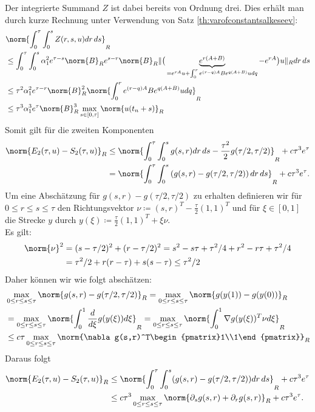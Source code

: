 Der integrierte Summand $Z$ ist dabei bereits von Ordnung drei. Dies erhält man durch kurze Rechnung unter Verwendung von Satz \ref{th:varofconstantsalkeseev}:
\begin{align*}
&\norm{\int_0^\tau\int_0^s Z(r,s,u)dr\,ds}_R\\
&\le \int_0^\tau\int_0^s \alpha_1^2e^{\tau-s}\norm{B}_Re^{s-r}\norm{B}_R\lVert\big(\underbrace{e^{r(A+B)}}_{=e^{rA}u+\int_0^r e^{(r-q)A}Be^{q(A+B)}udq}-e^{rA}\big)u\rVert_Rdr\,ds\\
&\le \tau^2\alpha_1^2e^{\tau-r}\norm{B}_R^2\norm{\int_0^re^{(r-q)A}Be^{q(A+B)}udq}_R\\
&\le \tau^3\alpha_1^3e^{\tau}\norm{B}_R^3\max_{s\in[0,\tau]}\norm{u(t_n+s)}_R
\end{align*} 
Somit gilt für die zweiten Komponenten
\begin{align*}
\norm{E_2(\tau,u)-S_2(\tau,u)}_R&\le \norm{\int_0^\tau\int_0^sg(s,r)dr\,ds-\frac{\tau^2}{2}g(\tau/2,\tau/2)}_R+c\tau^3e^\tau\\
&=\norm{\int_0^\tau\int_0^s\left(g(s,r)-g(\tau/2,\tau/2)\right)dr\,ds}_R+c\tau^3e^\tau.
\end{align*}
Um eine Abschätzung für $g(s,r)-g(\tau/2,\tau/2)$ zu erhalten definieren wir für $0\le r\le s\le\tau$ den Richtungsvektor $\nu\coloneqq (s,r)^T-\frac{\tau}{2}(1,1)^T$ und für $\xi\in[0,1]$ die Strecke $y$ durch $y(\xi)\coloneqq \frac{\tau}{2}(1,1)^T+\xi \nu$.\\
Es gilt:
\begin{align*}
\norm{\nu}^2&=(s-\tau/2)^2+(r-\tau/2)^2=s^2-s\tau+\tau^2/4+r^2-r\tau+\tau^2/4\\
&=\tau^2/2+r(r-\tau)+s(s-\tau)\le \tau^2/2
\end{align*}
Daher können wir wie folgt abschätzen:
\begin{align*}
&\max_{0\le r\le s\le \tau}\norm{g(s,r)-g(\tau/2,\tau/2)}_R=\max_{0\le r\le s\le \tau}\norm{g(y(1))-g(y(0))}_R\\
&=\max_{0\le r\le s\le \tau}\norm{\int_0^1\frac{d}{d\xi}g(y(\xi))d\xi}_R=\max_{0\le r\le s\le \tau}\norm{\int_0^1\nabla g(y(\xi))^T\nu d\xi}_R\\
&\le c\tau \max_{0\le r\le s\le \tau}\norm{\nabla g(s,r)^T\begin{pmatrix}1\\1\end{pmatrix}}_R
\end{align*}
Daraus folgt
\begin{align*}
\norm{E_2(\tau,u)-S_2(\tau,u)}_R
&\le\norm{\int_0^\tau\int_0^s(g(s,r)-g(\tau/2,\tau/2))dr\,ds}_R+c\tau^3e^\tau\\
&\le c\tau^3\max_{0\le r\le s\le \tau}\norm{\partial_sg(s,r)+\partial_rg(s,r)}_R+c\tau^3e^\tau.
\end{align*}
